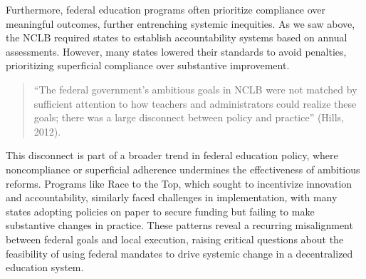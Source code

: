 \documentclass[11pt]{extarticle}
\begin{document}
Furthermore, federal education programs often prioritize compliance over meaningful outcomes, further entrenching systemic inequities. As we saw above, the NCLB required states to establish accountability systems based on annual assessments. However, many states lowered their standards to avoid penalties, prioritizing superficial compliance over substantive improvement.
\begin{quote}
``The federal government’s ambitious goals in NCLB were not matched by sufficient attention to how teachers and administrators could realize these goals; there was a large disconnect between policy and practice” (Hills, 2012).
\end{quote}
This disconnect is part of a broader trend in federal education policy, where noncompliance or superficial adherence undermines the effectiveness of ambitious reforms. Programs like Race to the Top, which sought to incentivize innovation and accountability, similarly faced challenges in implementation, with many states adopting policies on paper to secure funding but failing to make substantive changes in practice. These patterns reveal a recurring misalignment between federal goals and local execution, raising critical questions about the feasibility of using federal mandates to drive systemic change in a decentralized education system.
\end{document}
